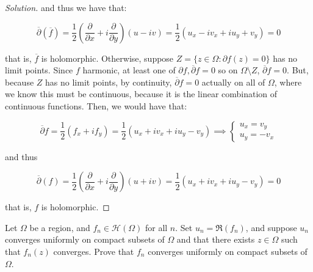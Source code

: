 \documentclass[10pt]{article}
\newenvironment{problem}[2][]{\begin{trivlist}
\item[\hskip \labelsep {\bfseries #1}\hskip \labelsep {\bfseries #2.}]}{\end{trivlist}}
\begin{document}
\begin{proof}[Solution]
and thus we have that:

$$\overline{\partial}( \overline{f}) =  \frac{1}{2} \left( \frac{\partial}{\partial x}+ i  \frac{\partial}{\partial y}\right) (u - i v) = \frac{1}{2} ( u_x - i v_x + i u_y + v_y) = 0 $$

that is, $\overline{f}$ is holomorphic. Otherwise, suppose $Z = \{ z \in \Omega : \partial f(z) = 0 \}$ has no limit points. Since $f$ harmonic, at least one of $\partial f, \overline{\partial} f = 0$ so on $\Omega \setminus Z$, $\overline{\partial} f = 0$. But, because $Z$ has no limit points, by continuity, $\overline{\partial} f = 0$ actually on all of $\Omega$, where we know this must be continuous, because it is the linear combination of continuous functions. Then, we would have that:

$$ \overline{\partial} f = \frac{1}{2} (f_x+ i f_y) = \frac{1}{2} (u_x + i v_x + i u_y - v_y) \implies  \begin{cases} u_x  = v_y \\ u_y = -v_x \end{cases}$$

and thus

$$ \overline{\partial}(f) = \frac{1}{2} \left( \frac{\partial}{\partial x}+ i  \frac{\partial}{\partial y}\right) (u + i v) = \frac{1}{2} ( u_x + i v_x + i u_y - v_y) = 0$$

that is, $f$ is holomorphic. 

\end{proof}

\begin{problem}{Question 4}

Let $\Omega$ be a region, and $f_n \in \mathcal{H}(\Omega)$ for all $n$. Set $u_n = \Re(f_n)$, and suppose $u_n$ converges uniformly on compact subsets of $\Omega$ and that there exists $z \in \Omega$ such that $f_n(z)$ converges. Prove that $f_n$ converges uniformly on compact subsets of $\Omega$.

\end{problem}
 
\end{document}

